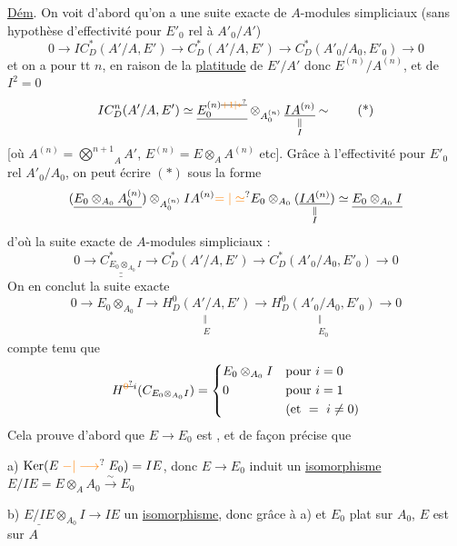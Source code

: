 \uline{Dém}.  On voit d'abord qu'on a une suite  exacte de $A$-modules simpliciaux (sans hypothèse d'effectivité pour $E'_0$ rel à $A'_0/A'$)
\[
0\longrightarrow IC_D^*(A'/A,E')\longrightarrow C_D^*(A'/A,E')\longrightarrow C_D^*(A'_0/A_0,E'_0)\longrightarrow0
\]
 et on a pour tt $n$, en raison de la \uline{platitude} de $E'/A'$ donc $E^{(n)}/A^{(n)}$, et de $I^2=0$
\[
IC_D^n(A'/A,E')\simeq \underline{E_0^{(n)\deleted{\unsure{+1|*}}}}\otimes_{A_0^{(n)}}\underset{\substack{\Vert\\ I}}{\underline{IA^{(n)}}}\sim
\tag*{(*)}
\]
[où $A^{(n)}=\overset{n+1}{\bigotimes}_A A'$, $E^{(n)}=E\otimes_A A^{(n)}$ etc]. Grâce à l'effectivité pour $E'_0$ rel $A'_0/A_0$, on peut écrire $(*)$ sous la forme
\[
(\underline{E_0\otimes_{A_0} A_0^{(n)}})\otimes_{A_0^{(n)}}IA^{(n)}
\unsure{=|\simeq}E_0\otimes_{A_0}(\underset{\substack{\Vert\\I}}{\underline{IA^{(n)}}})\simeq\underline{E_0\otimes_{A_0}I}
\]
d'où la  suite exacte de $A$-modules simpliciaux :
\[
0\longrightarrow \underline{\underline{C^*_{E_0\otimes_{A_0}I}}}\longrightarrow C_D^*(A'/A,E')\longrightarrow C_D^*(A'_0/A_0,E'_0)\longrightarrow0
\]
On en conclut la suite exacte
\[
0\longrightarrow E_0\otimes_{A_0}I\longrightarrow
\underset{\substack{\Vert\\E}}{H_D^0(A'/A,E')}\longrightarrow
\underset{\substack{\Vert\\E_0}}{H_D^0(A'_0/A_0,E'_0)}\longrightarrow0
\]
compte tenu que
\[
H^{\deleted{\unsure{0}}i}(C_{E_0\otimes_{A_0}I})=
\left\{\begin{aligned}
&E_0\otimes_{A_0}I &&\text{pour }i=0\\
&0 &&\text{pour }i=1\\
&&&(\text{et }=\ i\ne0)
\end{aligned}\right.
\]
Cela prouve d'abord que $E\longrightarrow E_0$ est ,  et de façon précise que

a) $\operatorname{Ker}(E\mathrel{\unsure{-|\longrightarrow}} E_0)=IE$, donc $E\longrightarrow E_0$ induit un \uline{isomorphisme} $E/IE=E\otimes_A A_0\xrightarrow{\sim}E_0$

b) $\underline{E/IE}\otimes_{A_0}I\longrightarrow IE$ un \uline{isomorphisme}, donc grâce à a) et $E_0$ plat sur $A_0$, $E$ est  sur $A$

